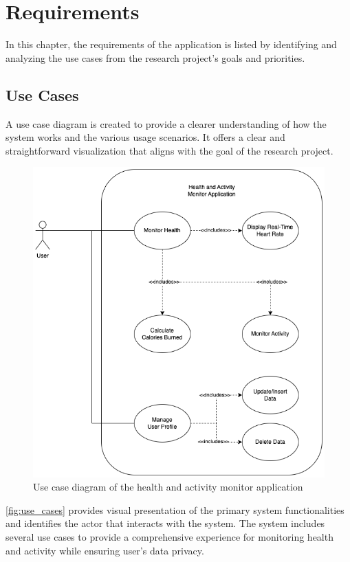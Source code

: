 \section{Requirements}
\label{chap:requirements}
In this chapter, the requirements of the application is listed by identifying and analyzing the use cases from the research project's goals and priorities.

\subsection{Use Cases}
\label{chap:use_case}
A use case diagram is created to provide a clearer understanding of how the system works and the various usage scenarios. It offers a clear and straightforward visualization that aligns with the goal of the research project.
\begin{figure}[H]
    \centering
    \includegraphics[width=1\textwidth]{diagrams/usecase.drawio.png}
    \caption{Use case diagram of the health and activity monitor application}
    \label{fig:use_cases}
\end{figure}
\newpage
\autoref{fig:use_cases} provides visual presentation of the primary system functionalities and identifies the actor that interacts with the system.
The system includes several use cases to provide a comprehensive experience for monitoring health and activity while ensuring user's data privacy.


